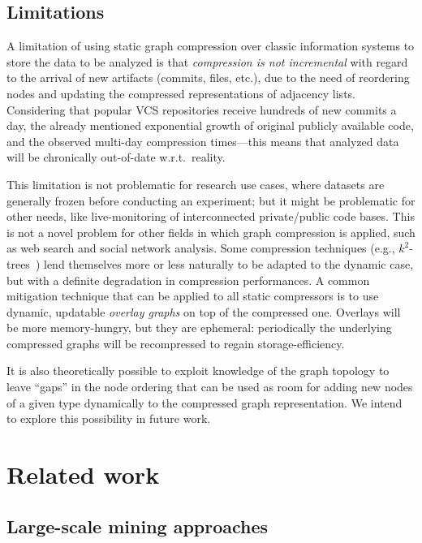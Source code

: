 \subsection{Limitations}%
\label{sec:compression-limitations}

A limitation of using static graph compression over classic information systems
to store the data to be analyzed is that \emph{compression is not incremental}
with regard to the arrival of new artifacts (commits, files, etc.), due to the
need of reordering nodes and updating the compressed representations of
adjacency lists. Considering that popular VCS repositories receive hundreds of
new commits a day, the already mentioned exponential growth of original
publicly available code, and the observed multi-day compression times---this
means that analyzed data will be chronically out-of-date w.r.t.~reality.

This limitation is not problematic for research use cases, where datasets are
generally frozen before conducting an experiment; but it might be problematic
for other needs, like live-monitoring of interconnected private/public code
bases. This is not a novel problem for other fields in which graph compression
is applied, such as web search and social network analysis. Some compression
techniques (e.g., $k^2$-trees~\cite{brisaboa2017compressed}) lend themselves
more or less naturally to be adapted to the dynamic case, but with a definite
degradation in compression performances. A common mitigation technique that can
be applied to all static compressors is to use dynamic, updatable \emph{overlay
  graphs} on top of the compressed one. Overlays will be more memory-hungry,
but they are ephemeral: periodically the underlying compressed graphs will be
recompressed to regain storage-efficiency.

It is also theoretically possible to exploit knowledge of the graph topology to
leave ``gaps'' in the node ordering that can be used as room for adding new
nodes of a given type dynamically to the compressed graph representation. We
intend to explore this possibility in future work.

\section{Related work}%
\label{sec:compression-related}

\subsection{Large-scale mining approaches}

